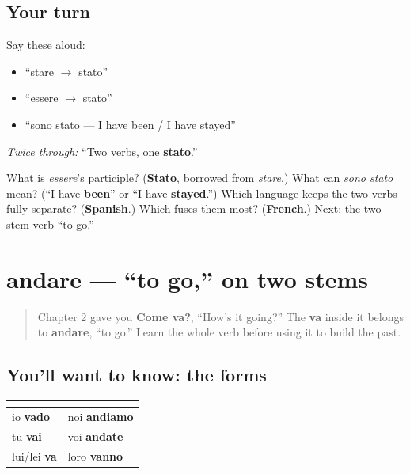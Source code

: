 \subsection*{Your turn}
Say these aloud:

\begin{itemize}
\raggedright
  \item “stare $\to$ stato”
  \item “essere $\to$ stato”
  \item “sono stato — I have been / I have stayed”
\end{itemize}

\emph{Twice through:} “Two verbs, one \textbf{stato}.”

\begin{tcolorbox}[breakable,colback=teal!4,colframe=teal!35!black,title={Before you move on}]
What is \emph{essere}’s participle? (\textbf{Stato}, borrowed from \emph{stare}.) What can \emph{sono stato} mean? (“I have \textbf{been}” or “I have \textbf{stayed}.”) Which language keeps the two verbs fully separate? (\textbf{Spanish}.) Which fuses them most? (\textbf{French}.) Next: the two-stem verb “to go.”
\end{tcolorbox}
\section[andare]{andare — “to go,” on two stems}

\label{lesson:IT-C16-andare}



\begin{quote}
Chapter 2 gave you \textbf{Come va?}, “How’s it going?” The \textbf{va} inside it belongs to \textbf{andare}, “to go.” Learn the whole verb before using it to build the past.
\end{quote}

\subsection*{You'll want to know: the forms}
\noindent
\begin{tabularx}{\linewidth}{@{}>{\raggedright\arraybackslash}X>{\raggedright\arraybackslash}X@{}}
\toprule
\textbf{} & \textbf{} \\
\midrule
io \textbf{vado} & noi \textbf{andiamo} \\
tu \textbf{vai} & voi \textbf{andate} \\
lui/lei \textbf{va} & loro \textbf{vanno} \\
\bottomrule
\end{tabularx}

